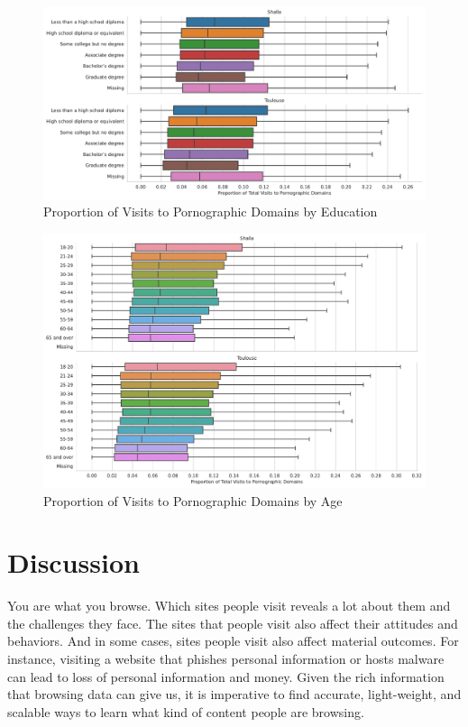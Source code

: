 \documentclass[12pt, letterpaper]{article}
\begin{document}
\begin{figure}[!htb]
  \centering
  \caption{Proportion of Visits to Pornographic Domains by Education}
	\label{fig:prop_visits_porn_educ}
	\includegraphics[width=\textwidth]{figs/prop_total_visits_porn_edu.pdf}
\end{figure}

\begin{figure}[!htb]
  \centering
  \caption{Proportion of Visits to Pornographic Domains by Age}
	\label{fig:prop_visits_porn_age}
	\includegraphics[width=\textwidth]{figs/prop_total_visits_porn_age.pdf}
\end{figure}

\section{Discussion}
You are what you browse. Which sites people visit reveals a lot about them and the challenges they face. The sites that people visit also affect their attitudes and behaviors. And in some cases, sites people visit also affect material outcomes. For instance, visiting a website that phishes personal information or hosts malware can lead to loss of personal information and money. Given the rich information that browsing data can give us, it is imperative to find accurate, light-weight, and scalable ways to learn what kind of content people are browsing.
\end{document}
